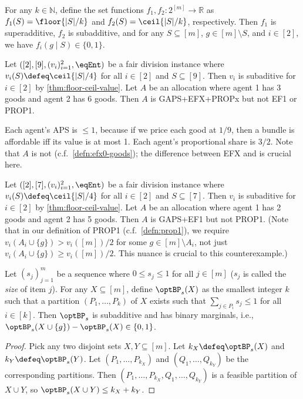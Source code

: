 \begin{lemma}
\label{thm:floor-ceil-value}
For any $k \in \mathbb{N}$, define the set functions $f_1, f_2: 2^{[m]} \to \mathbb{R}$ as
$f_1(S) = \floor{|S|/k}$ and $f_2(S) = \ceil{|S|/k}$, respectively.
Then $f_1$ is superadditive, $f_2$ is subadditive,
and for any $S \subseteq [m]$, $g \in [m] \setminus S$, and $i \in [2]$,
we have $f_i(g \mid S) \in \{0, 1\}$.
\end{lemma}

\begin{example}
\label{cex:gaps-not-ef1-prop1-subadd}
Let $([2], [9], (v_i)_{i=1}^2, \eqEnt)$ be a fair division instance where
$v_i(S) \defeq \ceil{|S|/4}$ for all $i \in [2]$ and $S \subseteq [9]$.
Then $v_i$ is subaditive for $i \in [2]$ by \cref{thm:floor-ceil-value}.
Let $A$ be an allocation where agent 1 has 3 goods and agent 2 has 6 goods.
Then $A$ is GAPS+EFX+PROPx but not EF1 or PROP1.

Each agent's APS is $\le 1$, because if we price each good at $1/9$,
then a bundle is affordable iff its value is at most 1.
Each agent's proportional share is $3/2$.
Note that $A$ is not \EFXZero{} (c.f.~\cref{defn:efx0-goods});
the difference between EFX and \EFXZero{} is crucial here.
\end{example}

\begin{example}
\label{cex:ef1-not-prop1-subadd}
Let $([2], [7], (v_i)_{i=1}^2, \eqEnt)$ be a fair division instance where
$v_i(S) \defeq \ceil{|S|/4}$ for all $i \in [2]$ and $S \subseteq [7]$.
Then $v_i$ is subaditive for $i \in [2]$ by \cref{thm:floor-ceil-value}.
Let $A$ be an allocation where agent 1 has 2 goods and agent 2 has 5 goods.
Then $A$ is GAPS+EF1 but not PROP1.
(Note that in our definition of PROP1 (c.f.~\cref{defn:prop1}), we require
$v_i(A_i \cup \{g\}) > v_i([m])/2$ for some $g \in [m] \setminus A_i$,
not just $v_i(A_i \cup \{g\}) \ge v_i([m])/2$.
This nuance is crucial to this counterexample.)
\end{example}

\begin{lemma}
\label{thm:bin-packing}
Let $(s_j)_{j=1}^m$ be a sequence where $0 \le s_j \le 1$ for all $j \in [m]$
($s_j$ is called the \emph{size} of item $j$).
For any $X \subseteq [m]$, define $\optBP_s(X)$ as the smallest integer $k$
such that a partition $(P_1, \ldots, P_k)$ of $X$ exists
such that $\sum_{j \in P_i} s_j \le 1$ for all $i \in [k]$.
Then $\optBP_s$ is subadditive and has binary marginals,
i.e., $\optBP_s(X \cup \{g\}) - \optBP_s(X) \in \{0, 1\}$.
\end{lemma}
\begin{proof}
Pick any two disjoint sets $X, Y \subseteq [m]$.
Let $k_X \defeq \optBP_s(X)$ and $k_Y \defeq \optBP_s(Y)$.
Let $(P_1, \ldots, P_{k_X})$ and $(Q_1, \ldots, Q_{k_Y})$ be the corresponding partitions.
Then $(P_1, \ldots, P_{k_X}, Q_1, \ldots, Q_{k_Y})$ is a feasible partition of $X \cup Y$,
so $\optBP_s(X \cup Y) \le k_X + k_Y$.
\end{proof}

